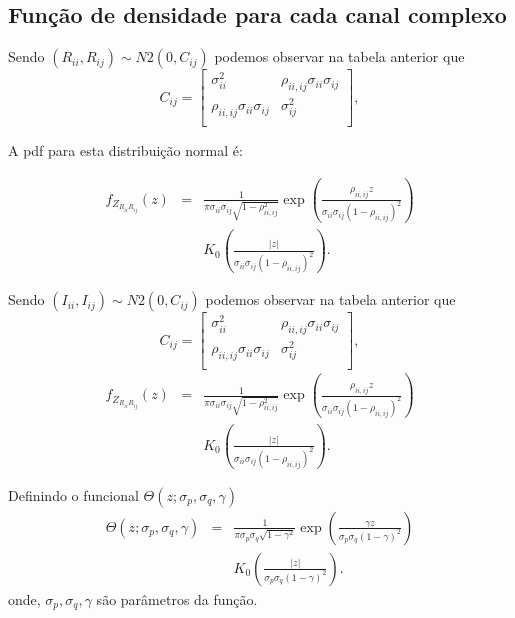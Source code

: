 \documentclass[conference]{IEEEtran}
\begin{document}
\subsection{Função de densidade para cada canal complexo}

Sendo $(R_{ii}, R_{ij})\sim N2(0, C_{ij})$ podemos observar na tabela anterior que 
\begin{equation}
C_{ij}=\left[
\begin{array}{cc}
	\sigma_{ii}^2   &  \rho_{ii,ij}\sigma_{ii}\sigma_{ij}  \\
	\rho_{ii,ij}\sigma_{ii}\sigma_{ij} & \sigma_{ij}^2   \\
\end{array}
\right],
\end{equation}

A pdf para esta distribuição normal é:

\begin{equation}
\begin{array}{ccc}
	f_{Z_{R_{ii}R_{ij}}}(z)&=&\frac{1}{\pi\sigma_{ii}\sigma_{ij}\sqrt{1-\rho_{ii,ij}^2}}\exp\left(\frac{\rho_{ii,ij}z}{\sigma_{ii}\sigma_{ij}(1-\rho_{ii,ij})^2}\right)\\
	&&K_0\left(\frac{|z|}{\sigma_{ii}\sigma_{ij}(1-\rho_{ii,ij})^2}\right).
\end{array}
\end{equation}


Sendo $(I_{ii}, I_{ij})\sim N2(0, C_{ij})$ podemos observar na tabela anterior que 
\begin{equation}
C_{ij}=\left[
\begin{array}{cc}
	\sigma_{ii}^2   &  \rho_{ii,ij}\sigma_{ii}\sigma_{ij}  \\
	\rho_{ii,ij}\sigma_{ii}\sigma_{ij} & \sigma_{ij}^2   \\
\end{array}
\right],
\end{equation}
\begin{equation}
\begin{array}{ccc}
	f_{Z_{R_{ii}R_{ij}}}(z)&=&\frac{1}{\pi\sigma_{ii}\sigma_{ij}\sqrt{1-\rho_{ii,ij}^2}}\exp\left(\frac{\rho_{ii,ij}z}{\sigma_{ii}\sigma_{ij}(1-\rho_{ii,ij})^2}\right)\\
	&&K_0\left(\frac{|z|}{\sigma_{ii}\sigma_{ij}(1-\rho_{ii,ij})^2}\right).
\end{array}
\end{equation}

Definindo o funcional $\Theta(z;\sigma_p,\sigma_q,\gamma)$
\begin{equation}
\begin{array}{ccc}
	\Theta(z;\sigma_p,\sigma_q,\gamma)&=&\frac{1}{\pi\sigma_p\sigma_q\sqrt{1-\gamma^2}}\exp\left(\frac{\gamma z}{\sigma_p\sigma_q(1-\gamma)^2}\right)\\
	&&K_0\left(\frac{|z|}{\sigma_p\sigma_q(1-\gamma)^2}\right).
\end{array}
\end{equation}
onde,  $\sigma_p,\sigma_q,\gamma$ são  parâmetros da função.
\end{document}
